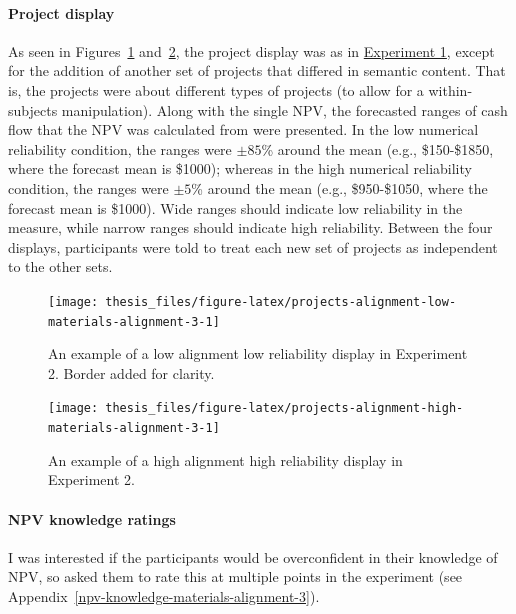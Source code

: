 \documentclass[a4paper, nobind, dvipsnames]{templates/ociamthesis}
\theoremstyle{definition}
\theoremstyle{definition}
\theoremstyle{definition}
\theoremstyle{definition}
\theoremstyle{remark}
\begin{document}
\hypertarget{project-display}{%
\paragraph{Project display}\label{project-display}}

As seen in Figures~\ref{fig:projects-alignment-low-materials-alignment-3}
and~\ref{fig:projects-alignment-high-materials-alignment-3}, the project
display was as in \protect\hyperlink{projects-materials-alignment-2}{Experiment 1}, except for
the addition of another set of projects that differed in semantic content. That
is, the projects were about different types of projects (to allow for a
within-subjects manipulation). Along with the single NPV, the forecasted ranges
of cash flow that the NPV was calculated from were presented. In the low
numerical reliability condition, the ranges were \(\pm85\)\% around the mean (e.g.,
\$150-\$1850, where the forecast mean is \$1000); whereas in the high numerical
reliability condition, the ranges were \(\pm5\)\% around the mean (e.g.,
\$950-\$1050, where the forecast mean is \$1000). Wide ranges should indicate low
reliability in the measure, while narrow ranges should indicate high
reliability. Between the four displays, participants were told to treat each new
set of projects as independent to the other sets.



\begin{figure}
\texttt{[image: thesis\_files/figure-latex/projects-alignment-low-materials-alignment-3-1]} \caption{An example of a low alignment low reliability display in Experiment 2. Border added for clarity.}\label{fig:projects-alignment-low-materials-alignment-3}
\end{figure}



\begin{figure}
\texttt{[image: thesis\_files/figure-latex/projects-alignment-high-materials-alignment-3-1]} \caption{An example of a high alignment high reliability display in Experiment 2.}\label{fig:projects-alignment-high-materials-alignment-3}
\end{figure}

\hypertarget{npv-knowledge-ratings}{%
\paragraph{NPV knowledge ratings}\label{npv-knowledge-ratings}}

I was interested if the participants would be overconfident in their knowledge
of NPV, so asked them to rate this at multiple points in the experiment (see
Appendix~\ref{npv-knowledge-materials-alignment-3}).
\end{document}
